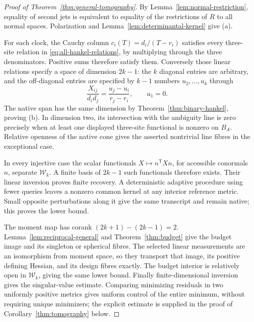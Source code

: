 \begin{proof}[Proof of Theorem~\ref{thm:general-tomography}]
By Lemma~\ref{lem:normal-restriction}, equality of second jets is equivalent to equality of the restrictions of $R$ to all normal spaces. Polarization and Lemma~\ref{lem:determinantal-kernel} give (a).

For each clock, the Cauchy column $c_i(T)=d_i/(T-r_i)$ satisfies every three-site relation in \eqref{eq:all-hankel-relations}, by multiplying through the three denominators. Positive sums therefore satisfy them. Conversely those linear relations specify a space of dimension $2k-1$: the $k$ diagonal entries are arbitrary, and the off-diagonal entries are specified by $k-1$ numbers $u_2,\ldots,u_k$ through
\[
 \frac{X_{ij}}{d_i d_j}=\frac{u_j-u_i}{r_j-r_i},\qquad u_1=0.
\]
The native span has the same dimension by Theorem~\ref{thm:binary-hankel}, proving (b). In dimension two, its intersection with the ambiguity line is zero precisely when at least one displayed three-site functional is nonzero on $B_A$. Relative openness of the native cone gives the asserted nontrivial line fibres in the exceptional case.

In every injective case the scalar functionals $X\mapsto n^{\mathsf T}Xn$, for accessible conormals $n$, separate $\mathscr W_k$. A finite basis of $2k-1$ such functionals therefore exists. Their linear inversion proves finite recovery. A deterministic adaptive procedure using fewer queries leaves a nonzero common kernel at any interior reference metric. Small opposite perturbations along it give the same transcript and remain native; this proves the lower bound.

The moment map has corank $(2k+1)-(2k-1)=2$. Lemma~\ref{lem:reciprocal-general} and Theorem~\ref{thm:budget} give the budget image and its singleton or spherical fibres. The selected linear measurements are an isomorphism from moment space, so they transport that image, its positive defining Hessian, and its design fibres exactly. The budget interior is relatively open in $\mathscr W_k$, giving the same lower bound. Finally finite-dimensional inversion gives the singular-value estimate. Comparing minimizing residuals in two uniformly positive metrics gives uniform control of the entire minimum, without requiring unique minimizers; the explicit estimate is supplied in the proof of Corollary~\ref{thm:tomography} below.
\end{proof}
